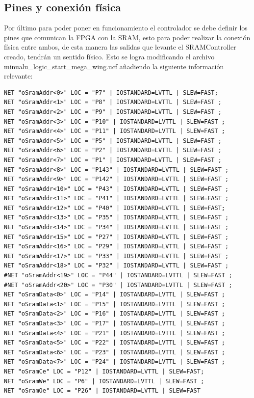 \documentclass[10pt]{article}
\begin{document}
\subsection*{Pines y conexión física}

Por último para poder poner en funcionamiento el controlador se debe definir los pines que comunican la FPGA con la SRAM, esto para poder realizar la conexión física entre ambos, de esta manera las salidas que levante el SRAMController creado, tendrán un sentido físico.
Esto se logra modificando el archivo minualu\_logic\_start\_mega\_wing.ucf añadiendo la siguiente información relevante:


\begin{lstlisting}
NET "oSramAddr<0>" LOC = "P7" | IOSTANDARD=LVTTL | SLEW=FAST;
NET "oSramAddr<1>" LOC = "P8" | IOSTANDARD=LVTTL | SLEW=FAST ;
NET "oSramAddr<2>" LOC = "P9" | IOSTANDARD=LVTTL | SLEW=FAST ;
NET "oSramAddr<3>" LOC = "P10" | IOSTANDARD=LVTTL | SLEW=FAST ;
NET "oSramAddr<4>" LOC = "P11" | IOSTANDARD=LVTTL | SLEW=FAST ;
NET "oSramAddr<5>" LOC = "P5" | IOSTANDARD=LVTTL | SLEW=FAST ;
NET "oSramAddr<6>" LOC = "P2" | IOSTANDARD=LVTTL | SLEW=FAST ;
NET "oSramAddr<7>" LOC = "P1" | IOSTANDARD=LVTTL | SLEW=FAST ;
NET "oSramAddr<8>" LOC = "P143" | IOSTANDARD=LVTTL | SLEW=FAST ;
NET "oSramAddr<9>" LOC = "P142" | IOSTANDARD=LVTTL | SLEW=FAST ;
NET "oSramAddr<10>" LOC = "P43" | IOSTANDARD=LVTTL | SLEW=FAST ;
NET "oSramAddr<11>" LOC = "P41" | IOSTANDARD=LVTTL | SLEW=FAST ;
NET "oSramAddr<12>" LOC = "P40" | IOSTANDARD=LVTTL | SLEW=FAST;
NET "oSramAddr<13>" LOC = "P35" | IOSTANDARD=LVTTL | SLEW=FAST ;
NET "oSramAddr<14>" LOC = "P34" | IOSTANDARD=LVTTL | SLEW=FAST ;
NET "oSramAddr<15>" LOC = "P27" | IOSTANDARD=LVTTL | SLEW=FAST ;
NET "oSramAddr<16>" LOC = "P29" | IOSTANDARD=LVTTL | SLEW=FAST ;
NET "oSramAddr<17>" LOC = "P33" | IOSTANDARD=LVTTL | SLEW=FAST ;
NET "oSramAddr<18>" LOC = "P32" | IOSTANDARD=LVTTL | SLEW=FAST ;
#NET "oSramAddr<19>" LOC = "P44" | IOSTANDARD=LVTTL | SLEW=FAST ;
#NET "oSramAddr<20>" LOC = "P30" | IOSTANDARD=LVTTL | SLEW=FAST ;
NET "oSramData<0>" LOC = "P14" | IOSTANDARD=LVTTL | SLEW=FAST ;
NET "oSramData<1>" LOC = "P15" | IOSTANDARD=LVTTL | SLEW=FAST ;
NET "oSramData<2>" LOC = "P16" | IOSTANDARD=LVTTL | SLEW=FAST ;
NET "oSramData<3>" LOC = "P17" | IOSTANDARD=LVTTL | SLEW=FAST ;
NET "oSramData<4>" LOC = "P21" | IOSTANDARD=LVTTL | SLEW=FAST ;
NET "oSramData<5>" LOC = "P22" | IOSTANDARD=LVTTL | SLEW=FAST ;
NET "oSramData<6>" LOC = "P23" | IOSTANDARD=LVTTL | SLEW=FAST ;
NET "oSramData<7>" LOC = "P24" | IOSTANDARD=LVTTL | SLEW=FAST ;
NET "oSramCe" LOC = "P12" | IOSTANDARD=LVTTL | SLEW=FAST;
NET "oSramWe" LOC = "P6" | IOSTANDARD=LVTTL | SLEW=FAST ;
NET "oSramOe" LOC = "P26" | IOSTANDARD=LVTTL | SLEW=FAST
\end{lstlisting}
\end{document}
